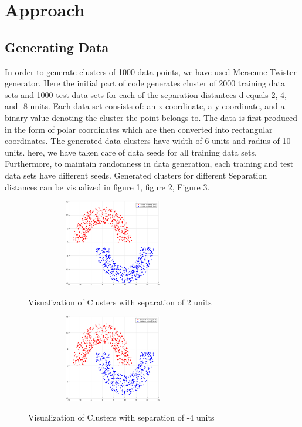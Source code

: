 \documentclass[conference]{IEEEtran}
\begin{document}
\section{Approach}

\subsection{Generating Data}
In order to generate clusters of 1000 data points, we have used Mersenne Twister \cite{twister} generator. Here the initial part of code generates cluster of 2000 training data sets and 1000 test data sets for each of the separation distantces d equals 2,-4, and -8 units. Each data set consists of: an x coordinate, a y coordinate, and a binary value denoting the cluster the point belongs to. The data is first produced in the form of polar coordinates which are then converted into rectangular coordinates. The generated data clusters have width of 6 units and radius of 10 units. here, we have taken care of data seeds for all training data sets. Furthermore, to maintain randomness in data generation, each training and test data sets have different seeds\cite{rng}. Generated clusters for different Separation distances can be visualized in figure 1, figure 2, Figure 3. 
\begin{figure}[h!]
\centering
{\includegraphics[width=3in, height=1.5in, clip, keepaspectratio]{ClustersD2.eps} }\\
\caption{ Visualization of Clusters with separation of 2 units}
\end{figure}

\begin{figure}[h!]
\centering
{\includegraphics[width=3in, height=1.5in, clip, keepaspectratio]{ClustersDn4.eps} }\\
\caption{ Visualization of Clusters with separation of -4 units}
\end{figure}
\end{document}
